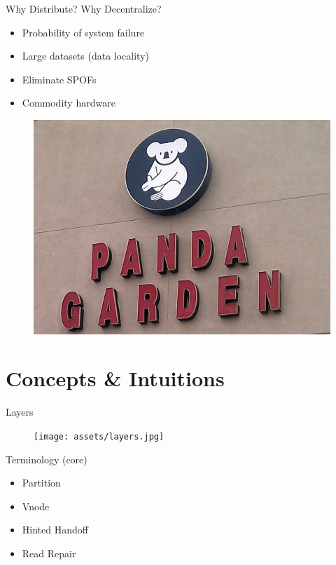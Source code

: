 \documentclass[compress]{beamer}
\begin{document}
\begin{frame}{Why Distribute? Why Decentralize?}
  \begin{itemize}
    \item \Large{Probability of system failure}
    \item \Large{Large datasets (data locality)}
    \item \Large{Eliminate SPOFs}
    \item \Large{Commodity hardware}
  \end{itemize}
\end{frame}

\begin{frame}
  \begin{figure}
    \centering
    \includegraphics[width=\linewidth]{assets/panda_garden_fail.jpg}
  \end{figure}
\end{frame}

\section{Concepts \& Intuitions}

\begin{frame}{Layers}
  \begin{figure}
    \centering
    \texttt{[image: assets/layers.jpg]}
  \end{figure}
\end{frame}

\begin{frame}{Terminology (core)}
\begin{itemize}
  \item Partition
  \item Vnode
  \item Hinted Handoff
  \item Read Repair
\end{itemize}
\end{frame}
\end{document}
